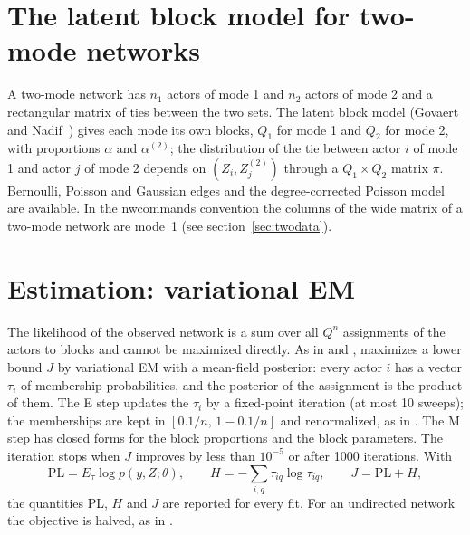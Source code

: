 \section{The latent block model for two-mode networks}
A two-mode network has $n_1$ actors of mode 1 and $n_2$ actors of mode 2 and a rectangular matrix of ties between the two sets. The latent block model (Govaert and Nadif~\cite{govaert2003}) gives each mode its own blocks, $Q_1$ for mode 1 and $Q_2$ for mode 2, with proportions $\alpha$ and $\alpha^{(2)}$; the distribution of the tie between actor $i$ of mode 1 and actor $j$ of mode 2 depends on $(Z_i,Z^{(2)}_j)$ through a $Q_1\times Q_2$ matrix $\pi$. Bernoulli, Poisson and Gaussian edges and the degree-corrected Poisson model are available. In the nwcommands convention the columns of the wide matrix of a two-mode network are mode~1 (see section~\ref{sec:twodata}).

\section{Estimation: variational EM}
The likelihood of the observed network is a sum over all $Q^n$ assignments of the actors to blocks and cannot be maximized directly. As in \blockmodels{} and \sbmR{}, \nwsbm{} maximizes a lower bound $J$ by variational EM with a mean-field posterior: every actor $i$ has a vector $\tau_i$ of membership probabilities, and the posterior of the assignment is the product of them. The E step updates the $\tau_i$ by a fixed-point iteration (at most 10 sweeps); the memberships are kept in $[0.1/n,\,1-0.1/n]$ and renormalized, as in \blockmodels{}. The M step has closed forms for the block proportions and the block parameters. The iteration stops when $J$ improves by less than $10^{-5}$ or after 1000 iterations. With
\[ \mathrm{PL}=E_\tau\log p(y,Z;\theta),\qquad H=-\sum_{i,q}\tau_{iq}\log\tau_{iq},\qquad J=\mathrm{PL}+H, \]
the quantities PL, $H$ and $J$ are reported for every fit. For an undirected network the objective is halved, as in \blockmodels{}.

